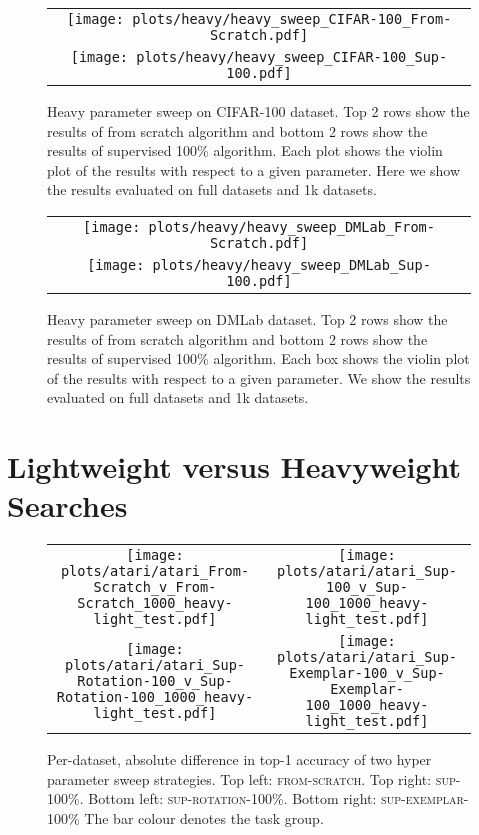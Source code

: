 \documentclass{article}
\begin{document}
\begin{figure}[H]
\centering
\begin{tabular}{c}
\texttt{[image: plots/heavy/heavy\_sweep\_CIFAR-100\_From-Scratch.pdf]}\\
\texttt{[image: plots/heavy/heavy\_sweep\_CIFAR-100\_Sup-100.pdf]}\\
\end{tabular}
\caption{
Heavy parameter sweep on CIFAR-100 dataset.
Top 2 rows show the results of from scratch algorithm and bottom 2 rows show the results of supervised 100\% algorithm.
Each plot shows the violin plot of the results with respect to a given parameter.
Here we show the results evaluated on full datasets and 1k datasets.
}\label{fig:heavy:cifar100}
\end{figure}

\begin{figure}[H]
\centering
\begin{tabular}{c}
\texttt{[image: plots/heavy/heavy\_sweep\_DMLab\_From-Scratch.pdf]}\\
\texttt{[image: plots/heavy/heavy\_sweep\_DMLab\_Sup-100.pdf]}\\
\end{tabular}
\caption{
Heavy parameter sweep on DMLab dataset.
Top 2 rows show the results of from scratch algorithm and bottom 2 rows show the results of supervised 100\% algorithm.
Each box shows the violin plot of the results with respect to a given parameter.
We show the results evaluated on full datasets and 1k datasets.
}\label{fig:heavy:dmlab}
\end{figure}

\clearpage
\section{Lightweight versus Heavyweight Searches\label{app:sweeps}}

\begin{figure}[H]
\centering
\begin{tabular}{cc}
\texttt{[image: plots/atari/atari\_From-Scratch\_v\_From-Scratch\_1000\_heavy-light\_test.pdf]}&
\texttt{[image: plots/atari/atari\_Sup-100\_v\_Sup-100\_1000\_heavy-light\_test.pdf]}\\
\texttt{[image: plots/atari/atari\_Sup-Rotation-100\_v\_Sup-Rotation-100\_1000\_heavy-light\_test.pdf]}&
\texttt{[image: plots/atari/atari\_Sup-Exemplar-100\_v\_Sup-Exemplar-100\_1000\_heavy-light\_test.pdf]}
\end{tabular}
\caption{
Per-dataset, absolute difference in top-1 accuracy of two hyper parameter sweep strategies.
Top left: \textsc{from-scratch}.
Top right: \textsc{sup-100\%}.
Bottom left: \textsc{sup-rotation-100\%}.
Bottom right: \textsc{sup-exemplar-100\%}
The bar colour denotes the task group.
}
\label{fig:atari-heavy-light}
\end{figure}
\end{document}

